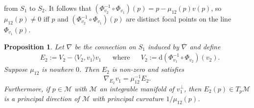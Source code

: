 \documentclass[12pt]{amsart}
\theoremstyle{plain}
\newtheorem{Prop}{Proposition}
\theoremstyle{definition}
\newcommand{\td}{\mathrm{d}}
\numberwithin{equation}{section}
\begin{document}
from $S_1$ to $S_2$. It follows that $(\Phi_{v_2}^{-1}\circ\Phi_{v_1})(p)=p-\mu_{12} (p)v(p)$, so $\mu_{12}(p)\neq 0$ iff $p$ and $(\Phi_{v_2}^{-1}\circ\Phi_{v_1})(p)$ are distinct focal points on the line $\Phi_{v_1}(p)$.
\begin{Prop}\label{prop: E_2 is eigen value of shape op on S1}
    Let $\nabla$ be the connection on $S_1$ induced by $\overline{\nabla}$ and define
    \begin{align*}
        &E_2:=V_2-\langle V_2,v_1\rangle v_1 &&\text{where} &&V_2:=\td(\Phi^{-1}_{v_1}\circ\Phi_{v_2})(v_2).
    \end{align*}
    Suppose $\mu_{12}$ is nowhere $0$. Then $E_2$ is non-zero and satisfies 
    \begin{equation}\label{equ: nabla_E_2 v_1}
    \nabla_{E_2}v_1=\mu_{12}^{-1}E_2.
\end{equation}
Furthermore, if $p\in \mathcal{M}$ with $\mathcal{M}$ an integrable manifold of $v_1^\perp$, then $E_2(p)\in T_p\mathcal{M}$ is a principal direction of $\mathcal{M}$ with principal curvature $1/\mu_{12}(p)$.
\end{Prop}
\end{document}
